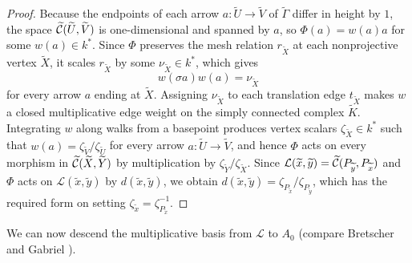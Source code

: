 \begin{proof}
Because the endpoints of each arrow $a:\widetilde U\to\widetilde V$ of
$\widetilde\Gamma$ differ in height by $1$, the space
$\widetilde{\mathcal C}(\widetilde U,\widetilde V)$ is one-dimensional and spanned by
$a$, so $\Phi(a)=w(a)a$ for some $w(a)\in k^*$. Since $\Phi$ preserves the
mesh relation $r_{\widetilde X}$ at each nonprojective vertex $\widetilde X$,
it scales $r_{\widetilde X}$ by some $\nu_{\widetilde X}\in k^*$, which
gives
\[
 w(\sigma a)w(a)=\nu_{\widetilde X}
\]
for every arrow $a$ ending at $\widetilde X$. Assigning $\nu_{\widetilde X}$
to each translation edge $t_{\widetilde X}$ makes $w$ a closed multiplicative
edge weight on the simply connected complex $\widetilde K$. Integrating $w$
along walks from a basepoint produces vertex scalars
$\zeta_{\widetilde X}\in k^*$ such that
$w(a)=\zeta_{\widetilde V}/\zeta_{\widetilde U}$ for every arrow
$a:\widetilde U\to\widetilde V$, and hence $\Phi$ acts on every morphism in
$\widetilde{\mathcal C}(\widetilde X,\widetilde Y)$ by multiplication by
$\zeta_{\widetilde Y}/\zeta_{\widetilde X}$. Since
$\mathcal L(\widetilde x,\widetilde y)=\widetilde{\mathcal C}(P_{\widetilde y},P_{\widetilde x})$
and $\Phi$ acts on $\mathcal L(\widetilde x,\widetilde y)$ by $d(\widetilde x,\widetilde y)$,
we obtain $d(\widetilde x,\widetilde y)=\zeta_{P_{\widetilde x}}/\zeta_{P_{\widetilde y}}$,
which has the required form on setting $\zeta_{\widetilde x}=\zeta_{P_{\widetilde x}}^{-1}$.
\end{proof}

We can now descend the multiplicative basis from $\mathcal L$ to $A_0$
(compare Bretscher and Gabriel \cite[Sections~3.1--3.2]{BretscherGabriel}).

